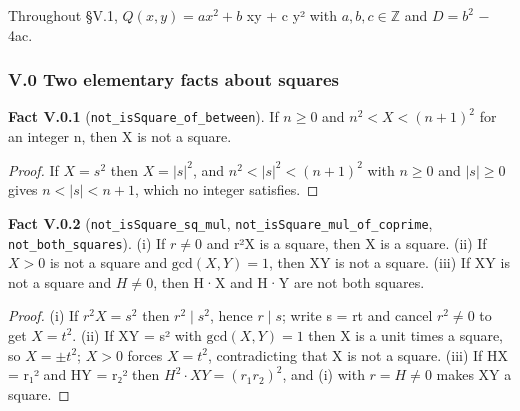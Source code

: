 Throughout §V.1, $Q(x,y) = a x^{2} + b$ xy + c y² with $a, b, c ∈ ℤ$ and $D = b^{2}$ − 4ac.

\subsubsection*{V.0 Two elementary facts about squares}
\textbf{Fact V.0.1} (\texttt{not\_\allowbreak{}isSquare\_\allowbreak{}of\_\allowbreak{}between}). If $n ≥ 0$ and $n^{2} < X < (n+1)^{2}$ for an integer n, then X is not a square.

\begin{proof}
If $X = s^{2}$ then $X = |s|^{2}$, and $n^{2} < |s|^{2} < (n+1)^{2}$ with $n ≥ 0$ and $|s| ≥ 0$ gives $n < |s| < n+1$, which no integer satisfies.

\end{proof}
\textbf{Fact V.0.2} (\texttt{not\_\allowbreak{}isSquare\_\allowbreak{}sq\_\allowbreak{}mul}, \texttt{not\_\allowbreak{}isSquare\_\allowbreak{}mul\_\allowbreak{}of\_\allowbreak{}coprime}, \texttt{not\_\allowbreak{}both\_\allowbreak{}squares}). (i) If $r ≠ 0$ and r²X is a square, then X is a square. (ii) If $X > 0$ is not a square and $\mathrm{gcd}(X, Y) = 1$, then XY is not a square. (iii) If XY is not a square and $H ≠ 0$, then H·X and H·Y are not both squares.

\begin{proof}
(i) If $r^{2}X = s^{2}$ then $r^{2} ∣ s^{2}$, hence $r ∣ s$; write s = rt and cancel $r^{2} ≠ 0$ to get $X = t^{2}$. (ii) If XY = s² with $\mathrm{gcd}(X,Y) = 1$ then X is a unit times a square, so $X = ±t^{2}$; $X > 0$ forces $X = t^{2}$, contradicting that X is not a square. (iii) If HX = r₁² and HY = r₂² then $H^{2}·XY = (r_{1}r_{2})^{2}$, and (i) with $r = H ≠ 0$ makes XY a square.

\end{proof}
